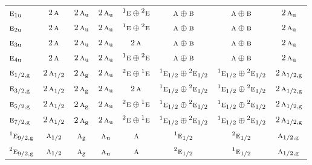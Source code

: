 \documentclass[10pt,a4paper]{article}
\numberwithin{equation}{section}
\newcommand{\irr}[1]{\text{\normalfont\scshape #1}}
\newcommand{\conjpair}[1]{{}^{#1}}
\newcommand{\ptag}[1]{\mathrm{#1}}
\begin{document}
{\begin{longtable}{@{}lccccccc@{}}
$\irr{e}_{1\ptag{u}}$ & $2\,\irr{a}$ & $2\,\irr{a}_{\ptag{u}}$ & $2\,\irr{a}_{\ptag{u}}$ & $\conjpair{1}\irr{e}\oplus \conjpair{2}\irr{e}$ & $\irr{a}\oplus \irr{b}$ & $\irr{a}\oplus \irr{b}$ & $2\,\irr{a}_{\ptag{u}}$\\
$\irr{e}_{2\ptag{u}}$ & $2\,\irr{a}$ & $2\,\irr{a}_{\ptag{u}}$ & $2\,\irr{a}_{\ptag{u}}$ & $\conjpair{1}\irr{e}\oplus \conjpair{2}\irr{e}$ & $\irr{a}\oplus \irr{b}$ & $\irr{a}\oplus \irr{b}$ & $2\,\irr{a}_{\ptag{u}}$\\
$\irr{e}_{3\ptag{u}}$ & $2\,\irr{a}$ & $2\,\irr{a}_{\ptag{u}}$ & $2\,\irr{a}_{\ptag{u}}$ & $2\,\irr{a}$ & $\irr{a}\oplus \irr{b}$ & $\irr{a}\oplus \irr{b}$ & $2\,\irr{a}_{\ptag{u}}$\\
$\irr{e}_{4\ptag{u}}$ & $2\,\irr{a}$ & $2\,\irr{a}_{\ptag{u}}$ & $2\,\irr{a}_{\ptag{u}}$ & $\conjpair{1}\irr{e}\oplus \conjpair{2}\irr{e}$ & $\irr{a}\oplus \irr{b}$ & $\irr{a}\oplus \irr{b}$ & $2\,\irr{a}_{\ptag{u}}$\\
$\irr{e}_{1/2,\ptag{g}}$ & $2\,\irr{a}_{1/2}$ & $2\,\irr{a}_{\ptag{g}}$ & $2\,\irr{a}_{\ptag{u}}$ & $\conjpair{2}\irr{e}\oplus \conjpair{1}\irr{e}$ & $\conjpair{1}\irr{e}_{1/2}\oplus \conjpair{2}\irr{e}_{1/2}$ & $\conjpair{1}\irr{e}_{1/2}\oplus \conjpair{2}\irr{e}_{1/2}$ & $2\,\irr{a}_{1/2,\ptag{g}}$\\
$\irr{e}_{3/2,\ptag{g}}$ & $2\,\irr{a}_{1/2}$ & $2\,\irr{a}_{\ptag{g}}$ & $2\,\irr{a}_{\ptag{u}}$ & $2\,\irr{a}$ & $\conjpair{1}\irr{e}_{1/2}\oplus \conjpair{2}\irr{e}_{1/2}$ & $\conjpair{1}\irr{e}_{1/2}\oplus \conjpair{2}\irr{e}_{1/2}$ & $2\,\irr{a}_{1/2,\ptag{g}}$\\
$\irr{e}_{5/2,\ptag{g}}$ & $2\,\irr{a}_{1/2}$ & $2\,\irr{a}_{\ptag{g}}$ & $2\,\irr{a}_{\ptag{u}}$ & $\conjpair{2}\irr{e}\oplus \conjpair{1}\irr{e}$ & $\conjpair{1}\irr{e}_{1/2}\oplus \conjpair{2}\irr{e}_{1/2}$ & $\conjpair{1}\irr{e}_{1/2}\oplus \conjpair{2}\irr{e}_{1/2}$ & $2\,\irr{a}_{1/2,\ptag{g}}$\\
$\irr{e}_{7/2,\ptag{g}}$ & $2\,\irr{a}_{1/2}$ & $2\,\irr{a}_{\ptag{g}}$ & $2\,\irr{a}_{\ptag{u}}$ & $\conjpair{2}\irr{e}\oplus \conjpair{1}\irr{e}$ & $\conjpair{1}\irr{e}_{1/2}\oplus \conjpair{2}\irr{e}_{1/2}$ & $\conjpair{1}\irr{e}_{1/2}\oplus \conjpair{2}\irr{e}_{1/2}$ & $2\,\irr{a}_{1/2,\ptag{g}}$\\
$\conjpair{1}\irr{e}_{9/2,\ptag{g}}$ & $\irr{a}_{1/2}$ & $\irr{a}_{\ptag{g}}$ & $\irr{a}_{\ptag{u}}$ & $\irr{a}$ & $\conjpair{1}\irr{e}_{1/2}$ & $\conjpair{2}\irr{e}_{1/2}$ & $\irr{a}_{1/2,\ptag{g}}$\\
$\conjpair{2}\irr{e}_{9/2,\ptag{g}}$ & $\irr{a}_{1/2}$ & $\irr{a}_{\ptag{g}}$ & $\irr{a}_{\ptag{u}}$ & $\irr{a}$ & $\conjpair{2}\irr{e}_{1/2}$ & $\conjpair{1}\irr{e}_{1/2}$ & $\irr{a}_{1/2,\ptag{g}}$\\

\end{longtable}}
\end{document}
